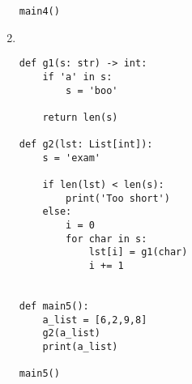 \documentclass{article}
\begin{document}
\begin{enumerate}
\begin{verbatim}
main4()
\end{verbatim}
\vfill

\item \
\begin{verbatim}
def g1(s: str) -> int:
    if 'a' in s:
        s = 'boo'

    return len(s)

def g2(lst: List[int]):
    s = 'exam'

    if len(lst) < len(s):
        print('Too short')
    else:
        i = 0
        for char in s:
            lst[i] = g1(char)
            i += 1


def main5():
    a_list = [6,2,9,8]
    g2(a_list)
    print(a_list)

main5()
\end{verbatim}

\vfill
\vfill


\end{enumerate}
\end{document}
